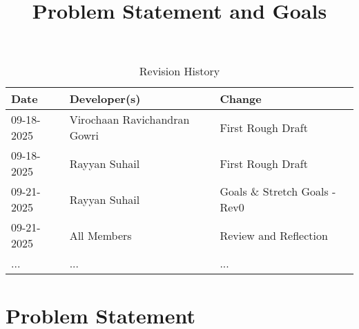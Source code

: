 \documentclass{article}
\title{Problem Statement and Goals\\\progname}
\author{\authname}
\date{}
\begin{document}
\maketitle

\begin{table}[hp]
\caption{Revision History} \label{TblRevisionHistory}
\begin{tabularx}{\textwidth}{llX}
\toprule
\textbf{Date} & \textbf{Developer(s)} & \textbf{Change}\\
\midrule
09-18-2025 & Virochaan Ravichandran Gowri & First Rough Draft\\
09-18-2025 & Rayyan Suhail & First Rough Draft\\
09-21-2025 & Rayyan Suhail & Goals \& Stretch Goals - Rev0\\
09-21-2025 & All Members & Review and Reflection\\
... & ... & ...\\
\bottomrule
\end{tabularx}
\end{table}
\newpage
\section{Problem Statement}
\end{document}
